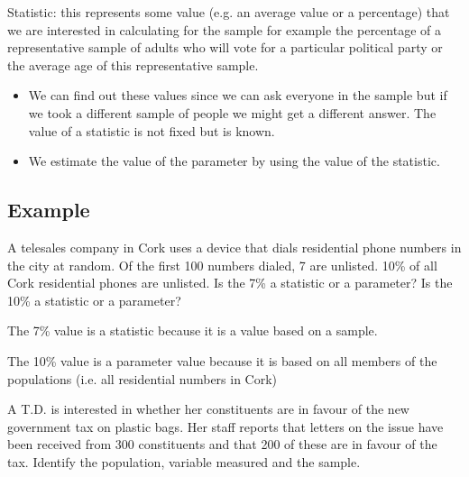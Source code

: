 ﻿\documentclass[]{report}
\begin{document}
Statistic: this represents some value (e.g. an average value or a percentage) that we are interested in calculating for the sample for example the percentage of a representative sample of adults who will vote for a particular political party or the average age of this representative sample. 


\begin{itemize}
\item We can find out these values since we can ask everyone in the sample but if we took a different sample of people we might get a different answer. The value of a statistic is not fixed but is known. 

\item We estimate the value of the parameter by using the value of the statistic.
\end{itemize}


\subsection{Example}

A telesales company in Cork uses a device that dials residential phone numbers in the city at random. Of the first 100 numbers dialed, 7 are unlisted.  10\% of all Cork residential phones are unlisted. Is the 7\% a statistic or a parameter? Is the 10\% a statistic or a parameter?






The 7\% value is a statistic because it is a value based on a sample.

The 10\% value is a parameter value because it is based on all members of the populations  (i.e. all residential numbers in Cork)


A T.D. is interested in whether her constituents are in favour of the new government tax on plastic bags. Her staff reports that letters on the issue have been received from 300 constituents and that 200 of these are in favour of the tax. Identify the population, variable measured and the sample. 
\end{document}
